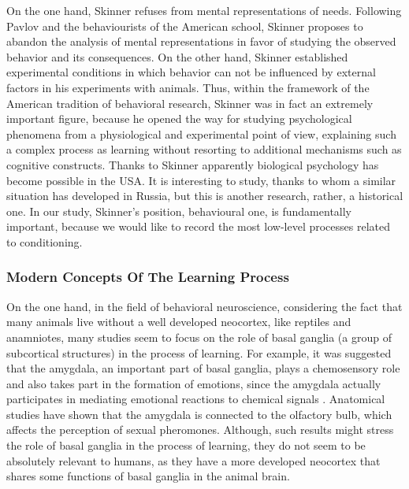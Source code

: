 \documentclass[14pt,a4paper]{scrartcl}
\begin{document}
On the one hand, Skinner refuses from mental representations of needs. Following Pavlov and the behaviourists of the American school, Skinner proposes to abandon the analysis of mental representations in favor of studying the observed behavior and its consequences. On the other hand, Skinner established experimental conditions in which behavior can not be influenced by external factors in his experiments with animals. Thus, within the framework of the American tradition of behavioral research, Skinner was in fact an extremely important figure, because he opened the way for studying psychological phenomena from a physiological and experimental point of view, explaining such a complex process as learning without resorting to additional mechanisms such as cognitive constructs. Thanks to Skinner apparently biological psychology has become possible in the USA. It is interesting to study, thanks to whom a similar situation has developed in Russia, but this is another research, rather, a historical one. In our study, Skinner's position, behavioural one, is fundamentally important, because we would like to record the most low-level processes related to conditioning.

\subsubsection{Modern Concepts Of The Learning Process}
\label{sec:Hypothesis:Learning Process:Modern Concepts Of The Learning Process}


On the one hand, in the field of behavioral neuroscience, considering the fact that many animals live without a well developed neocortex, like reptiles and anamniotes, many studies seem to focus on the role of basal ganglia (a group of subcortical structures) in the process of learning. For example, it was suggested that the amygdala, an important part of basal ganglia, plays a chemosensory role and also takes part in the formation of emotions, since the amygdala actually participates in mediating emotional reactions to chemical signals \cite{Martinez-Garcia2010}. Anatomical studies have shown that the amygdala is connected to the olfactory bulb, which affects the perception of sexual pheromones. Although, such results might stress the role of basal ganglia in the process of learning, they do not seem to be absolutely relevant to humans, as they have a more developed neocortex that shares some functions of basal ganglia in the animal brain.
\end{document}

